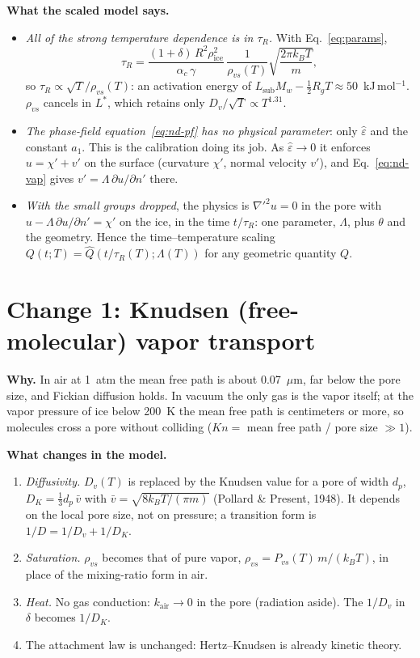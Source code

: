 \documentclass[11pt]{article}
\newcommand{\ice}{\mathrm{ice}}
\newcommand{\air}{\mathrm{air}}
\newcommand{\rvs}{\rho_{vs}}
\newcommand{\eh}{\hat\varepsilon}
\begin{document}
\textbf{What the scaled model says.}
\begin{itemize}
\item \emph{All of the strong temperature dependence is in $\tau_{R}$.} With
  Eq.~\eqref{eq:params},
  \[
  \tau_{R} = \frac{(1+\delta)\,R^{2}\rho_\ice^{2}}{\alpha_c\,\gamma}\,\frac{1}{\rvs(T)}\sqrt{\frac{2\pi k_BT}{m}} ,
  \]
  so $\tau_{R} \propto \sqrt T/\rvs(T)$: an activation energy of
  $L_{\mathrm{sub}}M_w - \tfrac12R_gT \approx 50$~kJ\,mol$^{-1}$. $\rvs$ cancels in $L^{*}$, which
  retains only $D_v/\sqrt T \propto T^{1.31}$.
\item \emph{The phase-field equation~\eqref{eq:nd-pf} has no physical
  parameter}: only $\eh$ and the constant $a_1$. This is the calibration
  doing its job. As $\eh \to 0$ it enforces $u = \chi' + v'$ on the surface
  (curvature $\chi'$, normal velocity $v'$), and Eq.~\eqref{eq:nd-vap} gives
  $v' = \Lambda\,\partial u/\partial n'$ there.
\item \emph{With the small groups dropped}, the physics is $\nabla'^{2}u =
  0$ in the pore with $u - \Lambda\,\partial u/\partial n' = \chi'$ on the
  ice, in the time $t/\tau_{R}$: one parameter, $\Lambda$, plus $\theta$ and the
  geometry. Hence the time--temperature scaling $Q(t;T) = \widehat
  Q(t/\tau_{R}(T);\Lambda(T))$ for any geometric quantity $Q$.
\end{itemize}

\section{Change 1: Knudsen (free-molecular) vapor transport}

\textbf{Why.} In air at 1~atm the mean free path is about 0.07~$\mu$m, far
below the pore size, and Fickian diffusion holds. In vacuum the only gas is
the vapor itself; at the vapor pressure of ice below 200~K the mean free path
is centimeters or more, so molecules cross a pore without colliding ($Kn =$
mean free path / pore size $\gg 1$).

\textbf{What changes in the model.}
\begin{enumerate}
\item \emph{Diffusivity.} $D_v(T)$ is replaced by the Knudsen value for a
  pore of width $d_p$, $D_K = \tfrac13 d_p\,\bar v$ with $\bar v =
  \sqrt{8k_BT/(\pi m)}$ (Pollard \& Present, 1948). It depends on the local
  pore size, not on pressure; a transition form is $1/D = 1/D_v + 1/D_K$.
\item \emph{Saturation.} $\rvs$ becomes that of pure vapor, $\rvs =
  P_{vs}(T)\,m/(k_BT)$, in place of the mixing-ratio form in air.
\item \emph{Heat.} No gas conduction: $k_\air \to 0$ in the pore (radiation
  aside). The $1/D_v$ in $\delta$ becomes $1/D_K$.
\item The attachment law is unchanged: Hertz--Knudsen is already kinetic
  theory.
\end{enumerate}
\end{document}
